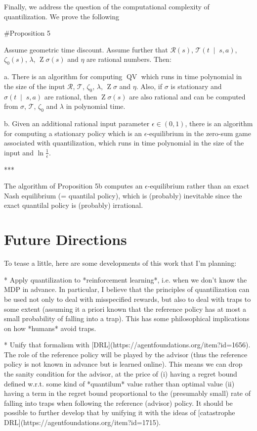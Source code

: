 \documentclass[a4paper]{article}
\newcommand{\APM}[2]{\left(#1\;\middle\vert\;#2\right)}
\newcommand{\T}{\mathcal{T}}
\newcommand{\R}{\mathcal{R}}
\newcommand{\QV}{\operatorname{QV}}
\DeclareMathOperator{\Z}{Z}
\begin{document}
Finally, we address the question of the computational complexity of quantilization. We prove the following

\#Proposition 5

Assume geometric time discount. Assume further that $\R(s)$, $\T\APM{t}{s,a}$, $\zeta_0(s)$, $\lambda$, $\Z{\sigma}(s)$ and $\eta$ are rational numbers. Then:

a. There is an algorithm for computing $\QV$ which runs in time polynomial in the size of the input $\R$, $\T$, $\zeta_0$, $\lambda$, $\Z\sigma$ and $\eta$. Also, if $\sigma$ is stationary and $\sigma\APM{t}{s,a}$ are rational, then $\Z{\sigma}(s)$ are also rational and can be computed from $\sigma$, $\T$, $\zeta_0$ and $\lambda$ in polynomial time.

b. Given an additional rational input parameter $\epsilon\in(0,1)$, there is an algorithm for computing a stationary policy which is an $\epsilon$-equilibrium in the zero-sum game associated with quantilization, which runs in time polynomial in the size of the input and $\ln\frac{1}{\epsilon}$.

***

The algorithm of Proposition 5b computes an $\epsilon$-equilibrium rather than an exact Nash equilibrium (= quantilal policy), which is (probably) inevitable since the exact quantilal policy is (probably) irrational.

\section{Future Directions}

To tease a little, here are some developments of this work that I'm planning:

* Apply quantilization to *reinforcement learning*, i.e. when we don't know the MDP in advance. In particular, I believe that the principles of quantilization can be used not only to deal with misspecified rewards, but also to deal with traps to some extent (assuming it a priori known that the reference policy has at most a small probability of falling into a trap). This has some philosophical implications on how *humans* avoid traps.

* Unify that formalism with [DRL](https://agentfoundations.org/item?id=1656). The role of the reference policy will be played by the advisor (thus the reference policy is not known in advance but is learned online). This means we can drop the sanity condition for the advisor, at the price of (i) having a regret bound defined w.r.t. some kind of *quantilum* value rather than optimal value (ii) having a term in the regret bound proportional to the (presumably small) rate of falling into traps when following the reference (advisor) policy. It should be possible to further develop that by unifying it with the ideas of [catastrophe DRL](https://agentfoundations.org/item?id=1715).
\end{document}
